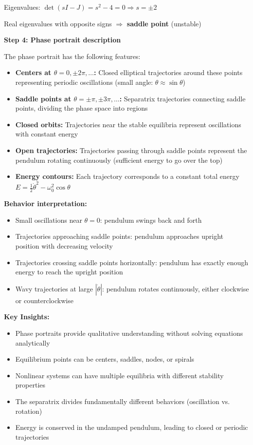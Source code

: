 \documentclass[11pt,a4paper]{article}
\begin{document}
Eigenvalues: $\det(sI - J) = s^2 - 4 = 0 \Rightarrow s = \pm 2$

Real eigenvalues with opposite signs $\Rightarrow$ \textbf{saddle point} (unstable)

\textbf{Step 4: Phase portrait description}

The phase portrait has the following features:

\begin{itemize}
\item \textbf{Centers at $\theta = 0, \pm 2\pi, \ldots$:} Closed elliptical trajectories around these points representing periodic oscillations (small angle: $\theta \approx \sin\theta$)
  
\item \textbf{Saddle points at $\theta = \pm\pi, \pm 3\pi, \ldots$:} Separatrix trajectories connecting saddle points, dividing the phase space into regions
  
\item \textbf{Closed orbits:} Trajectories near the stable equilibria represent oscillations with constant energy
  
\item \textbf{Open trajectories:} Trajectories passing through saddle points represent the pendulum rotating continuously (sufficient energy to go over the top)
  
\item \textbf{Energy contours:} Each trajectory corresponds to a constant total energy $E = \frac{1}{2}\dot{\theta}^2 - \omega_0^2\cos\theta$
\end{itemize}

\textbf{Behavior interpretation:}
\begin{itemize}
\item Small oscillations near $\theta = 0$: pendulum swings back and forth
\item Trajectories approaching saddle points: pendulum approaches upright position with decreasing velocity
\item Trajectories crossing saddle points horizontally: pendulum has exactly enough energy to reach the upright position
\item Wavy trajectories at large $|\dot{\theta}|$: pendulum rotates continuously, either clockwise or counterclockwise
\end{itemize}

\textbf{Key Insights:}
\begin{itemize}
\item Phase portraits provide qualitative understanding without solving equations analytically
\item Equilibrium points can be centers, saddles, nodes, or spirals
\item Nonlinear systems can have multiple equilibria with different stability properties
\item The separatrix divides fundamentally different behaviors (oscillation vs. rotation)
\item Energy is conserved in the undamped pendulum, leading to closed or periodic trajectories
\end{itemize}
\end{document}

